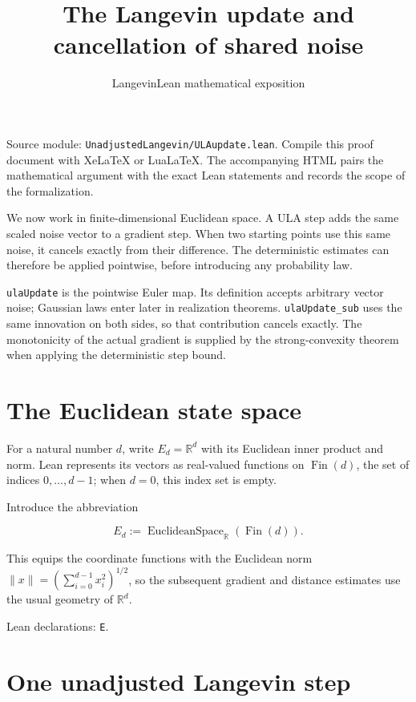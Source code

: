 \documentclass[11pt]{article}
\title{The Langevin update and cancellation of shared noise}
\author{LangevinLean mathematical exposition}
\date{}
\begin{document}
\maketitle
\noindent Source module: \texttt{UnadjustedLangevin/ULAupdate.lean}. Compile this proof document with XeLaTeX or LuaLaTeX. The accompanying HTML pairs the mathematical argument with the exact Lean statements and records the scope of the formalization.


We now work in finite-dimensional Euclidean space. A ULA step adds the same scaled noise vector to a gradient step. When two starting points use this same noise, it cancels exactly from their difference. The deterministic estimates can therefore be applied pointwise, before introducing any probability law.



\texttt{ulaUpdate} is the pointwise Euler map. Its definition accepts arbitrary vector noise; Gaussian laws enter later in realization theorems. \texttt{ulaUpdate\_sub} uses the same innovation on both sides, so that contribution cancels exactly. The monotonicity of the actual gradient is supplied by the strong-convexity theorem when applying the deterministic step bound.


\section{The Euclidean state space}


For a natural number \(d\), write \(E_d=\mathbb R^d\) with its Euclidean inner product and norm. Lean represents its vectors as real-valued functions on \(\operatorname{Fin}(d)\), the set of indices \(0,\ldots,d-1\); when \(d=0\), this index set is empty.



Introduce the abbreviation

\[E_d:=\operatorname{EuclideanSpace}_{\mathbb R}(\operatorname{Fin}(d)).\]

This equips the coordinate functions with the Euclidean norm \(\|x\|=(\sum_{i=0}^{d-1}x_i^2)^{1/2}\), so the subsequent gradient and distance estimates use the usual geometry of \(\mathbb R^d\).



\noindent Lean declarations: \texttt{E}.

\section{One unadjusted Langevin step}
\end{document}
